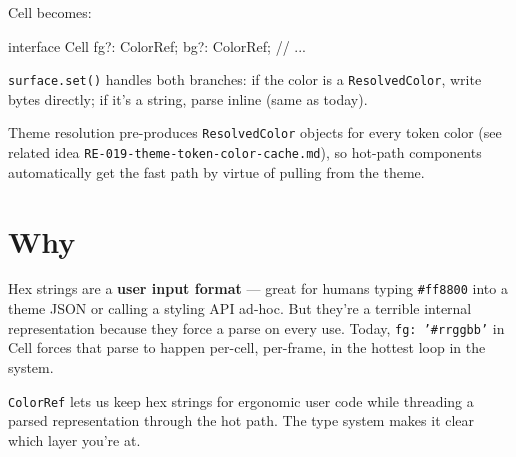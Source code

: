 Cell becomes:

\begin{CodeBlock}
interface Cell {
  fg?: ColorRef;
  bg?: ColorRef;
  // ...
}
\end{CodeBlock}

\texttt{s\allowbreak{}u\allowbreak{}r\allowbreak{}f\allowbreak{}a\allowbreak{}c\allowbreak{}e\allowbreak{}.\allowbreak{}s\allowbreak{}e\allowbreak{}t\allowbreak{}(\allowbreak{})} handles both branches: if the color is a \texttt{R\allowbreak{}e\allowbreak{}s\allowbreak{}o\allowbreak{}l\allowbreak{}v\allowbreak{}e\allowbreak{}d\allowbreak{}C\allowbreak{}o\allowbreak{}l\allowbreak{}o\allowbreak{}r}, write bytes directly; if it's a string, parse inline (same as today).

Theme resolution pre-produces \texttt{R\allowbreak{}e\allowbreak{}s\allowbreak{}o\allowbreak{}l\allowbreak{}v\allowbreak{}e\allowbreak{}d\allowbreak{}C\allowbreak{}o\allowbreak{}l\allowbreak{}o\allowbreak{}r} objects for every token color (see related idea \texttt{R\allowbreak{}E\allowbreak{}-\allowbreak{}0\allowbreak{}1\allowbreak{}9\allowbreak{}-\allowbreak{}t\allowbreak{}h\allowbreak{}e\allowbreak{}m\allowbreak{}e\allowbreak{}-\allowbreak{}t\allowbreak{}o\allowbreak{}k\allowbreak{}e\allowbreak{}n\allowbreak{}-\allowbreak{}c\allowbreak{}o\allowbreak{}l\allowbreak{}o\allowbreak{}r\allowbreak{}-\allowbreak{}c\allowbreak{}a\allowbreak{}c\allowbreak{}h\allowbreak{}e\allowbreak{}.\allowbreak{}m\allowbreak{}d}), so hot-path components automatically get the fast path by virtue of pulling from the theme.

\section{Why}\label{record-370-why}

Hex strings are a \textbf{user input format} --- great for humans typing \texttt{\#\allowbreak{}f\allowbreak{}f\allowbreak{}8\allowbreak{}8\allowbreak{}0\allowbreak{}0} into a theme JSON or calling a styling API ad-hoc. But they're a terrible internal representation because they force a parse on every use. Today, \texttt{f\allowbreak{}g\allowbreak{}:\allowbreak{} \allowbreak{}'\allowbreak{}\#\allowbreak{}r\allowbreak{}r\allowbreak{}g\allowbreak{}g\allowbreak{}b\allowbreak{}b\allowbreak{}'} in Cell forces that parse to happen per-cell, per-frame, in the hottest loop in the system.

\texttt{C\allowbreak{}o\allowbreak{}l\allowbreak{}o\allowbreak{}r\allowbreak{}R\allowbreak{}e\allowbreak{}f} lets us keep hex strings for ergonomic user code while threading a parsed representation through the hot path. The type system makes it clear which layer you're at.

